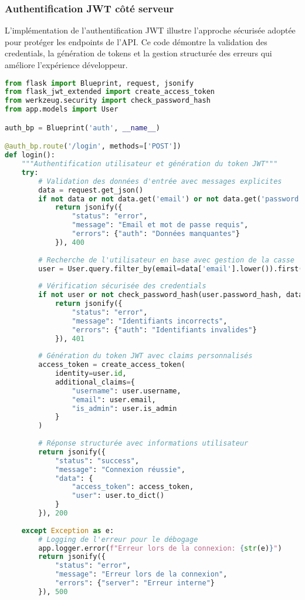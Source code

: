 \subsubsection{Authentification JWT côté serveur}

L'implémentation de l'authentification JWT illustre l'approche sécurisée adoptée pour protéger les endpoints de l'API. Ce code démontre la validation des credentials, la génération de tokens et la gestion structurée des erreurs qui améliore l'expérience développeur.

\begin{lstlisting}[language=python, caption=Endpoint d'authentification avec JWT]
from flask import Blueprint, request, jsonify
from flask_jwt_extended import create_access_token
from werkzeug.security import check_password_hash
from app.models import User

auth_bp = Blueprint('auth', __name__)

@auth_bp.route('/login', methods=['POST'])
def login():
    """Authentification utilisateur et génération du token JWT"""
    try:
        # Validation des données d'entrée avec messages explicites
        data = request.get_json()
        if not data or not data.get('email') or not data.get('password'):
            return jsonify({
                "status": "error",
                "message": "Email et mot de passe requis",
                "errors": {"auth": "Données manquantes"}
            }), 400
        
        # Recherche de l'utilisateur en base avec gestion de la casse
        user = User.query.filter_by(email=data['email'].lower()).first()
        
        # Vérification sécurisée des credentials
        if not user or not check_password_hash(user.password_hash, data['password']):
            return jsonify({
                "status": "error",
                "message": "Identifiants incorrects",
                "errors": {"auth": "Identifiants invalides"}
            }), 401
        
        # Génération du token JWT avec claims personnalisés
        access_token = create_access_token(
            identity=user.id,
            additional_claims={
                "username": user.username,
                "email": user.email,
                "is_admin": user.is_admin
            }
        )
        
        # Réponse structurée avec informations utilisateur
        return jsonify({
            "status": "success",
            "message": "Connexion réussie",
            "data": {
                "access_token": access_token,
                "user": user.to_dict()
            }
        }), 200
        
    except Exception as e:
        # Logging de l'erreur pour le débogage
        app.logger.error(f"Erreur lors de la connexion: {str(e)}")
        return jsonify({
            "status": "error",
            "message": "Erreur lors de la connexion",
            "errors": {"server": "Erreur interne"}
        }), 500
\end{lstlisting}

